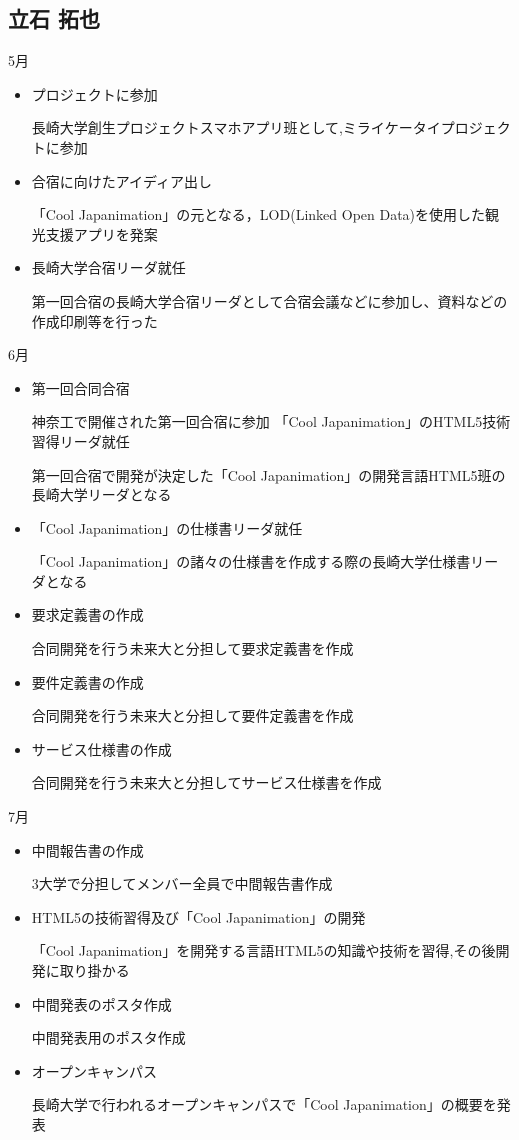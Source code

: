 \subsection{立石 拓也}
5月
\begin{itemize}
\item プロジェクトに参加
\par 長崎大学創生プロジェクトスマホアプリ班として,ミライケータイプロジェクトに参加
\item 合宿に向けたアイディア出し
\par「Cool Japanimation」の元となる，LOD(Linked Open Data)を使用した観光支援アプリを発案
\item 長崎大学合宿リーダ就任
\par 第一回合宿の長崎大学合宿リーダとして合宿会議などに参加し、資料などの作成印刷等を行った\end{itemize}
6月
\begin{itemize}
\item 第一回合同合宿
\par 神奈工で開催された第一回合宿に参加
「Cool Japanimation」のHTML5技術習得リーダ就任
\par 第一回合宿で開発が決定した「Cool Japanimation」の開発言語HTML5班の長崎大学リーダとなる
\item 「Cool Japanimation」の仕様書リーダ就任
\par 「Cool Japanimation」の諸々の仕様書を作成する際の長崎大学仕様書リーダとなる
\item 要求定義書の作成
\par 合同開発を行う未来大と分担して要求定義書を作成
\item 要件定義書の作成
\par 合同開発を行う未来大と分担して要件定義書を作成
\item サービス仕様書の作成
\par 合同開発を行う未来大と分担してサービス仕様書を作成
\end{itemize}
7月
\begin{itemize}
\item 中間報告書の作成
\par 3大学で分担してメンバー全員で中間報告書作成
\item HTML5の技術習得及び「Cool Japanimation」の開発
\par 「Cool Japanimation」を開発する言語HTML5の知識や技術を習得,その後開発に取り掛かる
\item 中間発表のポスタ作成
\par 中間発表用のポスタ作成
\item オープンキャンパス
\par 長崎大学で行われるオープンキャンパスで「Cool Japanimation」の概要を発表
\end{itemize}
